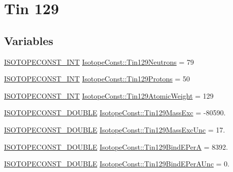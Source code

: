 \hypertarget{group___isotope_const-_tin-_sn129}{}\section{Tin 129}
\label{group___isotope_const-_tin-_sn129}
\subsection*{Variables}
\begin{DoxyCompactItemize}
\item 
\mbox{\hyperlink{group___isotope_const-_macros_ga5f18360b3e99483a35c32d789e62621c}{I\+S\+O\+T\+O\+P\+E\+C\+O\+N\+S\+T\+\_\+\+I\+NT}} \mbox{\hyperlink{group___isotope_const-_tin-_sn129_ga6270f920e5eb0c63471cedc2dd4c8d58}{Isotope\+Const\+::\+Tin129\+Neutrons}} = 79
\item 
\mbox{\hyperlink{group___isotope_const-_macros_ga5f18360b3e99483a35c32d789e62621c}{I\+S\+O\+T\+O\+P\+E\+C\+O\+N\+S\+T\+\_\+\+I\+NT}} \mbox{\hyperlink{group___isotope_const-_tin-_sn129_ga9308d13e959d4481e3b6ae550fe661cb}{Isotope\+Const\+::\+Tin129\+Protons}} = 50
\item 
\mbox{\hyperlink{group___isotope_const-_macros_ga5f18360b3e99483a35c32d789e62621c}{I\+S\+O\+T\+O\+P\+E\+C\+O\+N\+S\+T\+\_\+\+I\+NT}} \mbox{\hyperlink{group___isotope_const-_tin-_sn129_ga6ed9352160ad1b609f1e17993cc5ed16}{Isotope\+Const\+::\+Tin129\+Atomic\+Weight}} = 129
\item 
\mbox{\hyperlink{group___isotope_const-_macros_ga8f45a7272ce02c0b4c65c44636ed719a}{I\+S\+O\+T\+O\+P\+E\+C\+O\+N\+S\+T\+\_\+\+D\+O\+U\+B\+LE}} \mbox{\hyperlink{group___isotope_const-_tin-_sn129_gaa775831748db60b4c3672fc33781befb}{Isotope\+Const\+::\+Tin129\+Mass\+Exc}} = -\/80590.
\item 
\mbox{\hyperlink{group___isotope_const-_macros_ga8f45a7272ce02c0b4c65c44636ed719a}{I\+S\+O\+T\+O\+P\+E\+C\+O\+N\+S\+T\+\_\+\+D\+O\+U\+B\+LE}} \mbox{\hyperlink{group___isotope_const-_tin-_sn129_ga939fb156d43616aabfbff59b92f686e0}{Isotope\+Const\+::\+Tin129\+Mass\+Exc\+Unc}} = 17.
\item 
\mbox{\hyperlink{group___isotope_const-_macros_ga8f45a7272ce02c0b4c65c44636ed719a}{I\+S\+O\+T\+O\+P\+E\+C\+O\+N\+S\+T\+\_\+\+D\+O\+U\+B\+LE}} \mbox{\hyperlink{group___isotope_const-_tin-_sn129_ga91838708c578220ab54aaa0d1c9fcdff}{Isotope\+Const\+::\+Tin129\+Bind\+E\+PerA}} = 8392.
\item 
\mbox{\hyperlink{group___isotope_const-_macros_ga8f45a7272ce02c0b4c65c44636ed719a}{I\+S\+O\+T\+O\+P\+E\+C\+O\+N\+S\+T\+\_\+\+D\+O\+U\+B\+LE}} \mbox{\hyperlink{group___isotope_const-_tin-_sn129_ga8946495a3bf492fb859fe403a9c20fd2}{Isotope\+Const\+::\+Tin129\+Bind\+E\+Per\+A\+Unc}} = 0.

\end{DoxyCompactItemize}
